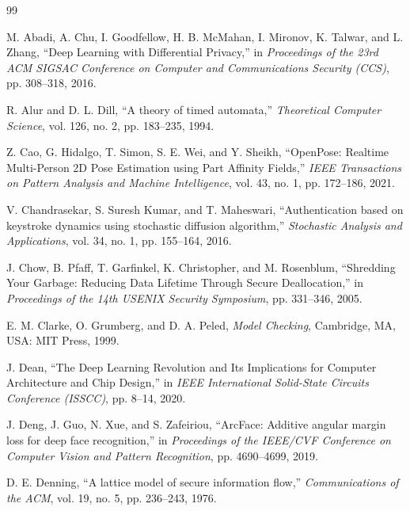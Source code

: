 \documentclass[12pt,a4paper,oneside]{report}
\begin{document}
\begingroup
\renewcommand{\chapter}[2]{} 
\begin{thebibliography}{99}

M. Abadi, A. Chu, I. Goodfellow, H. B. McMahan, I. Mironov, K. Talwar, and L. Zhang, ``Deep Learning with Differential Privacy,'' in \textit{Proceedings of the 23rd ACM SIGSAC Conference on Computer and Communications Security (CCS)}, pp. 308--318, 2016.

R. Alur and D. L. Dill, ``A theory of timed automata,'' \textit{Theoretical Computer Science}, vol. 126, no. 2, pp. 183--235, 1994.

Z. Cao, G. Hidalgo, T. Simon, S. E. Wei, and Y. Sheikh, ``OpenPose: Realtime Multi-Person 2D Pose Estimation using Part Affinity Fields,'' \textit{IEEE Transactions on Pattern Analysis and Machine Intelligence}, vol. 43, no. 1, pp. 172--186, 2021.

V. Chandrasekar, S. Suresh Kumar, and T. Maheswari, ``Authentication based on keystroke dynamics using stochastic diffusion algorithm,'' \textit{Stochastic Analysis and Applications}, vol. 34, no. 1, pp. 155--164, 2016.

J. Chow, B. Pfaff, T. Garfinkel, K. Christopher, and M. Rosenblum, ``Shredding Your Garbage: Reducing Data Lifetime Through Secure Deallocation,'' in \textit{Proceedings of the 14th USENIX Security Symposium}, pp. 331--346, 2005.

E. M. Clarke, O. Grumberg, and D. A. Peled, \textit{Model Checking}, Cambridge, MA, USA: MIT Press, 1999.

J. Dean, ``The Deep Learning Revolution and Its Implications for Computer Architecture and Chip Design,'' in \textit{IEEE International Solid-State Circuits Conference (ISSCC)}, pp. 8--14, 2020.

J. Deng, J. Guo, N. Xue, and S. Zafeiriou, ``ArcFace: Additive angular margin loss for deep face recognition,'' in \textit{Proceedings of the IEEE/CVF Conference on Computer Vision and Pattern Recognition}, pp. 4690--4699, 2019.

D. E. Denning, ``A lattice model of secure information flow,'' \textit{Communications of the ACM}, vol. 19, no. 5, pp. 236--243, 1976.


\end{thebibliography}
\end{document}
